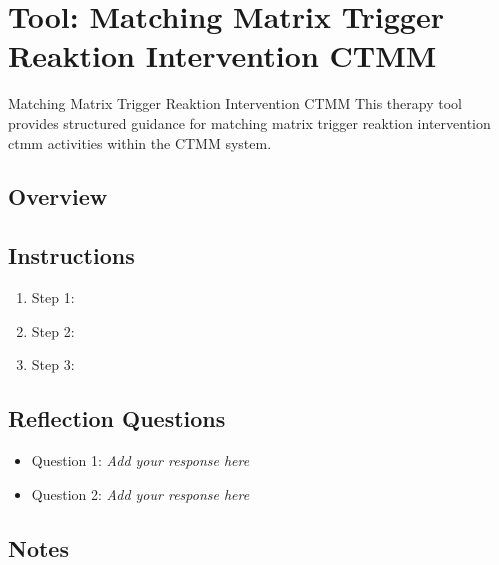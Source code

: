 
\section{Tool: Matching Matrix Trigger Reaktion Intervention CTMM}
\label{sec:tool-matching-matrix-trigger-reaktion-intervention-ctmm}

\begin{ctmmBlueBox}{Matching Matrix Trigger Reaktion Intervention CTMM}
This therapy tool provides structured guidance for matching matrix trigger reaktion intervention ctmm activities within the CTMM system.
\end{ctmmBlueBox}

\subsection{Overview}

\subsection{Instructions}

\begin{enumerate}
\item Step 1: \checkbox~
\item Step 2: \checkbox~
\item Step 3: \checkbox~
\end{enumerate}

\subsection{Reflection Questions}

\begin{itemize}
\item Question 1: \textit{Add your response here}
\item Question 2: \textit{Add your response here}
\end{itemize}

\subsection{Notes}

\vspace{2cm}

